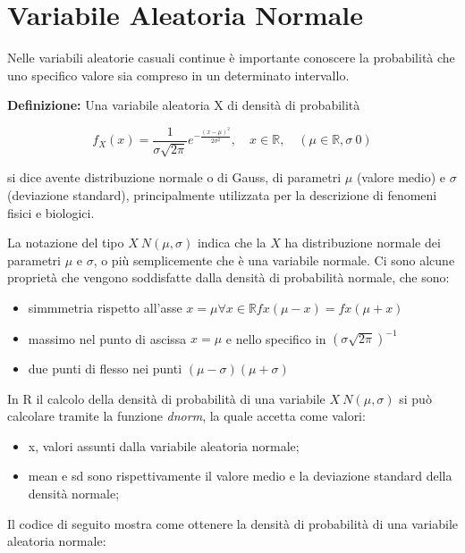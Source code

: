 \section{Variabile Aleatoria Normale}

Nelle variabili aleatorie casuali continue è importante conoscere la probabilità che uno specifico valore sia compreso in un determinato intervallo.

\noindent \textbf{Definizione:} Una variabile aleatoria X di densità di probabilità

\[f_X(x) = \frac{1}{\sigma \sqrt{2\pi}}e^{-\frac{(x-\mu)^2}{2\sigma^2}}, \quad x \in \mathbb{R}, \quad (\mu \in \mathbb{R}, \sigma \> 0) \]

si dice avente distribuzione normale o di Gauss, di parametri $\mu$ (valore medio) e $\sigma$ (deviazione standard), principalmente utilizzata per la descrizione di fenomeni fisici e biologici.

La notazione del tipo $X ~ N(\mu, \sigma)$ indica che la $X$ ha distribuzione normale dei parametri $\mu$ e $\sigma$, o più semplicemente che è una variabile normale. Ci sono alcune proprietà che vengono soddisfatte dalla densità di probabilità normale, che sono:

\begin{itemize}
    \item simmmetria rispetto all'asse $x = \mu \forall x \in \mathbb{R} fx(\mu - x) = fx(\mu + x)$
    \item massimo nel punto di ascissa $x = \mu$ e nello specifico in $(\sigma \sqrt{2\pi})^{-1}$
    \item due punti di flesso nei punti $(\mu - \sigma)(\mu + \sigma)$
\end{itemize}

In R il calcolo della densità di probabilità di una variabile 
$X ~ N(\mu, \sigma)$ si può calcolare tramite la funzione \textit{dnorm}, la quale accetta come valori:

\begin{itemize}
    \item x, valori assunti dalla variabile aleatoria normale;
    \item mean e sd sono rispettivamente il valore medio e la deviazione standard della densità normale;
\end{itemize}

Il codice di seguito mostra come ottenere la densità di probabilità di una variabile aleatoria normale:

